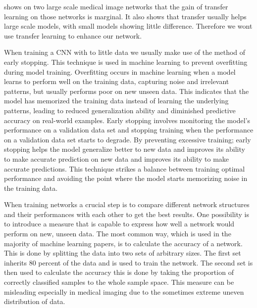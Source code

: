 \documentclass[
a4paper, 
12pt,
grayscalebody, %
abstract=on,
twoside, BCOR10mm, 12pt, DIV13,headinclude, footexclude, final, abstracton, openright
]{ibireprt}
\numberwithin{equation}{chapter}
\numberwithin{table}{chapter}
\numberwithin{figure}{chapter}
\numberwithin{algorithm}{chapter}
\numberwithin{example}{chapter}
\numberwithin{example}{chapter}
\begin{document}
\cite{Raghu2019} shows on two large scale medical image networks that the gain of transfer learning on those networks is marginal. It also shows that transfer usually helps large scale models, with small models showing little difference. Therefore we wont use transfer learning to enhance our network.


When training a CNN with to little data we usually make use of the method of early stopping. This technique is used in machine learning to prevent overfitting during model training. Overfitting occurs in machine learning when a model learns to perform well on the training data, capturing noise and irrelevant patterns, but usually performs poor on new unseen data. This indicates that the model has memorized the training data instead of learning the underlying patterns, leading to reduced generalization ability and diminished predictive accuracy on real-world examples. Early stopping involves monitoring the model's performance on a validation data set and stopping training when the performance on a validation data set starts to degrade. By preventing excessive training; early stopping helps the model generalize better to new data and improves its ability to make accurate prediction on new data and improves its ability to make accurate predictions.
This technique strikes a balance between training optimal performance and avoiding the point where the model starts memorizing noise in the training data. %




When training networks a crucial step is to compare different network structures and their performances with each other to get the best results. One possibility is to introduce a measure that is capable to express how well a network would perform on new, unseen data. The most common way, which is used in the majority of machine learning papers, is to calculate the accuracy of a network. This is done by splitting the data into two sets of arbitrary sizes. The first set inherits 80 percent of the data and is used to train the network. The second set is then used to calculate the accuracy this is done by taking the proportion of correctly classified samples to the whole sample space. This measure can be misleading especially in medical imaging due to the sometimes extreme uneven distribution of data. 
\end{document}
